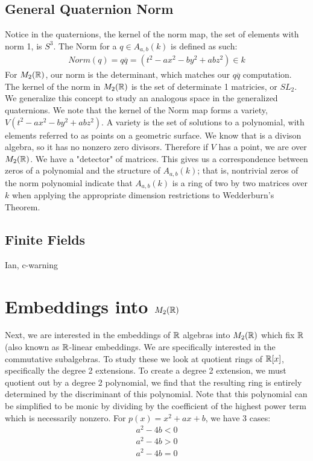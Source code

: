 \documentclass{article}
\begin{document}
\subsection{General Quaternion Norm}
Notice in the quaternions, the kernel of the norm map, the set of elements with norm 1, is $S^3$. 
The Norm for a $q\in A_{a,b}(k)$ is defined as such: 
\begin{gather*}
    Norm(q) = q\overline{q} = (t^2 -ax^2 -by^2 +abz^2) \in k
\end{gather*}
For $M_2(\protect\mathbb{R})$, our norm is the determinant, which matches our $q\overline{q}$ computation. The kernel of the norm in $M_2(\protect\mathbb{R})$ is the set of determinate 1 matricies, or $SL_2$. 
We generalize this concept to study an analogous space in the generalized quaternions. We note that the kernel of the Norm map forms a variety, $V(t^2 - ax^2 -by^2 + abz^2)$. A variety is the set of solutions to a polynomial, with elements referred to as points on a geometric surface. We know that \bH is a divison algebra, so it has no nonzero zero divisors. Therefore if $V$ has a point, we are over $M_2(\protect\mathbb{R})$. We have a "detector" of matrices. This gives us a correspondence between zeros of a polynomial and the structure of $A_{a,b}(k)$; that is, nontrivial zeros of the norm polynomial indicate that $A_{a,b}(k)$ is a ring of two by two matrices over $k$ when applying the appropriate dimension restrictions to Wedderburn's Theorem.

\subsection{Finite Fields}
Ian, c-warning 

\section{Embeddings into $M_2(\protect\mathbb{R})$}
Next, we are interested in the embeddings of $\protect\mathbb{R}$ algebras into $M_2(\protect\mathbb{R})$ which fix $\protect\mathbb{R}$ (also known as $\protect\mathbb{R}$-linear embeddings. We are specifically interested in the commutative subalgebras. To study these we look at quotient rings of $\protect\mathbb{R}[x]$, specifically the degree 2 extensions. To create a degree 2 extension, we must quotient out by a degree 2 polynomial, we find that the resulting ring is entirely determined by the discriminant of this polynomial. Note that this polynomial can be simplified to be monic by dividing by the coefficient of the highest power term which is necessarily nonzero. For $p(x) = x^2 + ax + b$, we have 3 cases: 
\begin{gather}
    a^2 - 4b < 0 \\
    a^2 - 4b > 0 \\
    a^2 - 4b = 0 
\end{gather}
\end{document}

